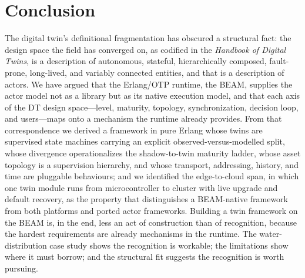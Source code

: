 \documentclass[conference]{IEEEtran}
\newcommand{\beam}{BEAM\xspace}
\newcommand{\otp}{OTP\xspace}
\newcommand{\dt}{DT\xspace}
\begin{document}
\section{Conclusion}
\label{sec:conc}
The digital twin's definitional fragmentation has obscured a structural fact:
the design space the field has converged on, as codified in the \emph{Handbook
of Digital Twins}, is a description of autonomous, stateful, hierarchically
composed, fault-prone, long-lived, and variably connected entities, and that is
a description of actors. We have argued that the Erlang/\otp runtime, the \beam,
supplies the actor model not as a library but as its native execution model,
and that each axis of the \dt design space---level, maturity, topology,
synchronization, decision loop, and users---maps onto a mechanism the runtime
already provides. From that correspondence we derived a framework in pure
Erlang whose twins are supervised state machines carrying an explicit
observed-versus-modelled split, whose divergence operationalizes the
shadow-to-twin maturity ladder, whose asset topology is a supervision hierarchy,
and whose transport, addressing, history, and time are pluggable behaviours; and
we identified the edge-to-cloud span, in which one twin module runs from
microcontroller to cluster with live upgrade and default recovery, as the
property that distinguishes a \beam-native framework from both platforms and
ported actor frameworks. Building a twin framework on the \beam is, in the end,
less an act of construction than of recognition, because the hardest
requirements are already mechanisms in the runtime. The water-distribution case
study shows the recognition is workable; the limitations show where it must
borrow; and the structural fit suggests the recognition is worth pursuing.
\end{document}
